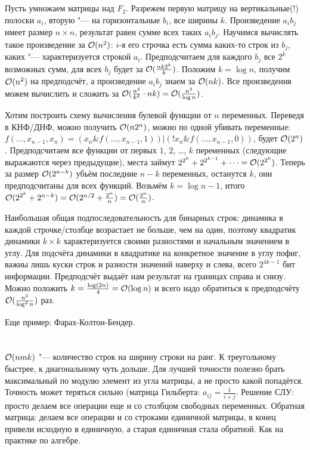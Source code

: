 \section{} %
Пусть умножаем матрицы над $F_2$.
Разрежем первую матрицу на вертикальные(!) полоски $a_i$, вторую "--- на горизонтальные $b_i$, все ширины $k$.
Произведение $a_ib_j$ имеет размер $n \times n$, результат равен сумме всех таких $a_ib_j$.
Научимся вычислять такое произведение за $\mathcal{O}(n^2)$: $i$-я его строчка есть сумма каких-то строк из $b_j$, каких "--- характеризуется строкой $a_i$.
Предподсчитаем для каждого $b_j$ все $2^k$ возможных сумм, для всех $b_j$ будет за $\mathcal{O}(\frac{nk2^k}{k})$.
Положим $k=\log n$, получим $\mathcal{O}(n^2)$ на предподсчёт, а произведение $a_ib_j$ знаем за $\mathcal{O}(nk)$.
Все произведения можем вычислить и сложить за $\mathcal{O}(\frac{n^2}{k^2} \cdot nk) = \mathcal{O}(\frac{n^3}{\log n})$.

Хотим построить схему вычисления булевой функции от $n$ переменных.
Переведя в КНФ/ДНФ, можно получить $\mathcal{O}(n2^n)$, можно по одной убивать переменные: $f(\dots, x_{n-1}, x_n) = (x_n \& f(\dots, x_{n-1}, 1)) | (!x_n \& f(\dots, x_{n-1}, 0))$, будет $\mathcal{O}(2^n)$.
Предподсчитаем все функции от первых $1$, $2$, \dots, $k$ переменных (следующие выражаются через предыдущие), места займут $2^{2^k} + 2^{2^{k-1}} + \dots = \mathcal{O}(2^{2^k})$.
Теперь за размер $\mathcal{O}(2^{n-k})$ убьём последние $n-k$ переменных, останутся $k$, они предподсчитаны для всех функций.
Возьмём $k=\log n - 1$, итого $\mathcal{O}(2^{2^k} + 2^{n-k})=\mathcal{O}(2^{n/2}+\frac{2^n}{n})=\mathcal{O}(\frac{2^n}{n})$.

Наибольшая общая подпоследовательность для бинарных строк: динамика в каждой строчке/столбце возрастает не больше, чем на один,
поэтому квадратик динамики $k \times k$ характеризуется своими разностями и начальным значением в углу.
Для подсчёта динамики в квадратике на конкретное значение в углу пофиг, важны лишь куски строк и разности значений наверху и слева,
всего $2^{4k-1}$ бит информации.
Предподсчёт выдаёт нам результат на границах справа и снизу.
Можно положить $k=\frac{\log(2n)}{4}=\mathcal{O}(\log n)$ и всего надо обратиться к предподсчёту $\mathcal{O}(\frac{n^2}{\log^2n})$ раз.

Еще пример: Фарах-Колтон-Бендер.

\section{} %
$\mathcal{O}(nmk)$ "--- количество строк на ширину строки на ранг.
К треугольному быстрее, к диагональному чуть дольше.
Для лучшей точности полезно брать максимальный по модулю элемент из угла матрицы, а не просто какой попадётся.
Точность может теряться сильно (матрица Гильберта: $a_{ij}=\frac{1}{i+j}$.
Решение СЛУ: просто делаем все операции еще и со столбцом свободных переменных.
Обратная матрица: делаем все операции и со строками единичной матрицы, в конец привели исходную в единичную, а старая единичная стала обратной.
Как на практике по алгебре.

